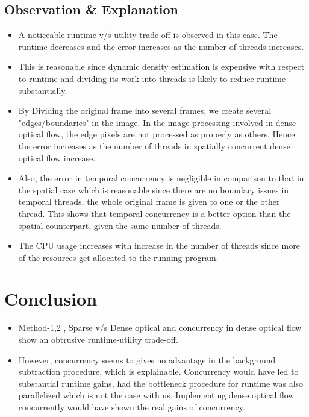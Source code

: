 \documentclass[a4paper]{article}
\begin{document}
\subsection*{Observation \& Explanation}
\begin{itemize}
    \item A noticeable runtime v/s utility trade-off is observed in this case. The runtime decreases and the error increases as the number of threads increases.
    \item  This is reasonable since dynamic density estimation is expensive with respect to runtime and dividing its work into threads is likely to reduce runtime substantially.
    \item By Dividing the original frame into several frames, we create several "edges/boundaries" in the image. In the image processing involved in dense optical flow, the edge pixels are not processed as properly as others. Hence the error increases as the number of threads in spatially concurrent dense optical flow increase.
    \item Also, the error in temporal concurrency is negligible in comparison to that in the spatial case which is reasonable since there are no boundary issues in temporal threads, the whole original frame is given to one or the other thread. This shows that temporal concurrency is a better option than the spatial counterpart, given the same number of threads.
    \item The CPU usage increases with increase in the number of threads since more of the resources get allocated to the running program.
\end{itemize}
\section*{Conclusion}
\begin{itemize}
    \item Method-1,2 , Sparse v/s Dense optical and concurrency in dense optical flow show an obtrusive runtime-utility trade-off.
    \item  However, concurrency seems to gives no advantage in the background subtraction procedure, which is explainable. Concurrency would have led to substantial runtime gains, had the bottleneck procedure for runtime was also parallelized which is not the case with us. Implementing dense optical flow concurrently would have shown the real gains of concurrency. 
\end{itemize}
\end{document}
